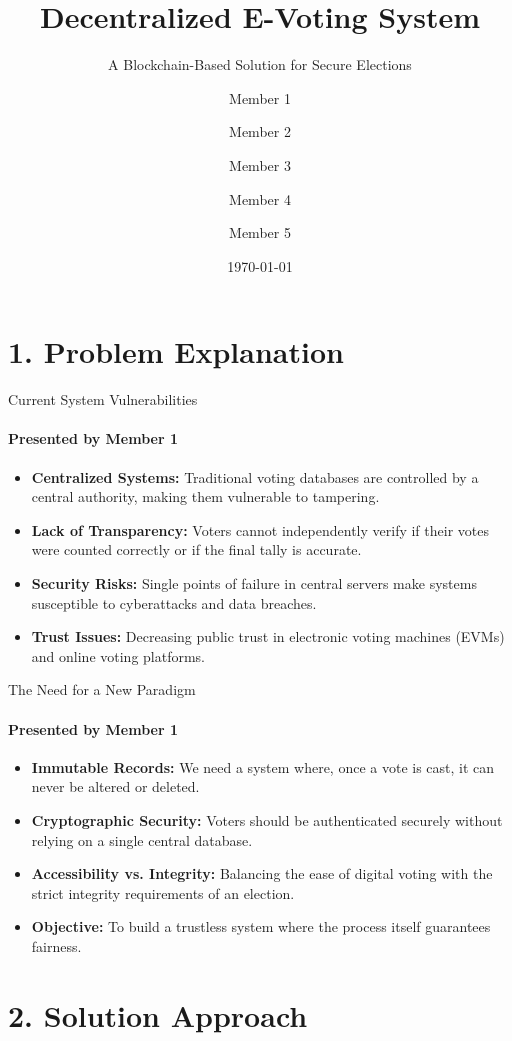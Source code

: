 \documentclass[aspectratio=169]{beamer}	%
\title{Decentralized E-Voting System}
\subtitle{A Blockchain-Based Solution for Secure Elections}
\author{Member 1 \and Member 2 \and Member 3 \and Member 4 \and Member 5}
\date{\today}
\begin{document}
\begin{frame}
  \titlepage
\end{frame}

\section{1. Problem Explanation}

\begin{frame}{Current System Vulnerabilities}
\framesubtitle{Presented by Member 1}
\begin{itemize}
    \item \textbf{Centralized Systems:} Traditional voting databases are controlled by a central authority, making them vulnerable to tampering.
    \item \textbf{Lack of Transparency:} Voters cannot independently verify if their votes were counted correctly or if the final tally is accurate.
    \item \textbf{Security Risks:} Single points of failure in central servers make systems susceptible to cyberattacks and data breaches.
    \item \textbf{Trust Issues:} Decreasing public trust in electronic voting machines (EVMs) and online voting platforms.
\end{itemize}
\end{frame}

\begin{frame}{The Need for a New Paradigm}
\framesubtitle{Presented by Member 1}
\begin{itemize}
    \item \textbf{Immutable Records:} We need a system where, once a vote is cast, it can never be altered or deleted.
    \item \textbf{Cryptographic Security:} Voters should be authenticated securely without relying on a single central database.
    \item \textbf{Accessibility vs. Integrity:} Balancing the ease of digital voting with the strict integrity requirements of an election.
    \item \textbf{Objective:} To build a trustless system where the process itself guarantees fairness.
\end{itemize}
\end{frame}

\section{2. Solution Approach}
\end{document}
